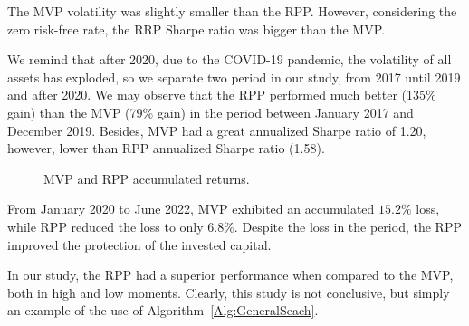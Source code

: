 The MVP volatility was slightly smaller than the RPP. However, considering the zero risk-free rate, the RRP Sharpe ratio was bigger than the MVP.




We remind that after 2020, due to the COVID-19 pandemic, the volatility of all assets has exploded, so we separate two period in our study, from 2017 until 2019 and after 2020. We may observe that the RPP performed much better (135\% gain) than the MVP (79\% gain) in the period between January 2017 and December 2019. Besides, MVP had a great annualized Sharpe ratio of 1.20, however, lower than RPP annualized Sharpe ratio (1.58). 



\begin{figure}[H]
	\begin{subfigmatrix}{2}
	\end{subfigmatrix}
	\caption{MVP and RPP accumulated returns.}
	\label{fig:retornoRPPMVP12}
\end{figure}

From January 2020 to June 2022, MVP exhibited an accumulated $15.2\%$ loss, while RPP reduced the loss to only $6.8\%$. Despite the loss in the period, the RPP improved the protection of the invested capital.



In our study, the RPP had a superior performance when compared to the MVP, both in high and low moments. Clearly, this study is not conclusive, but simply an example of the use of Algorithm~\ref{Alg:GeneralSeach}.

